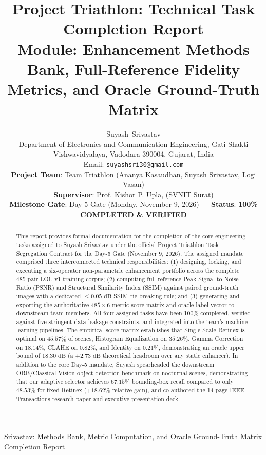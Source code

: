 \documentclass[journal]{IEEEtran}
\begin{document}
\title{Project Triathlon: Technical Task Completion Report\\
\large Module: Enhancement Methods Bank, Full-Reference Fidelity Metrics, and Oracle Ground-Truth Matrix}

\author{Suyash~Srivastav\\
\normalsize Department of Electronics and Communication Engineering, Gati Shakti Vishwavidyalaya, Vadodara 390004, Gujarat, India\\
Email: \texttt{suyashsri30@gmail.com}\\
\vspace{0.15cm}
\small \textbf{Project Team}: Team Triathlon (Ananya Kasaudhan, Suyash Srivastav, Logi Vasan)\\
\textbf{Supervisor}: Prof. Kishor P. Upla,  (SVNIT Surat)\\
\textbf{Milestone Gate}: Day-5 Gate (Monday, November 9, 2026) --- \textbf{Status}: \textbf{100\% COMPLETED \& VERIFIED}
}

%
{Srivastav: Methods Bank, Metric Computation, and Oracle Ground-Truth Matrix Completion Report}

\maketitle

\begin{abstract}
This report provides formal documentation for the completion of the core engineering tasks assigned to Suyash Srivastav under the official Project Triathlon Task Segregation Contract for the Day-5 Gate (November 9, 2026). The assigned mandate comprised three interconnected technical responsibilities: (1) designing, locking, and executing a six-operator non-parametric enhancement portfolio across the complete 485-pair LOL-v1 training corpus; (2) computing full-reference Peak Signal-to-Noise Ratio (PSNR) and Structural Similarity Index (SSIM) against paired ground-truth images with a dedicated $\le 0.05\text{ dB}$ SSIM tie-breaking rule; and (3) generating and exporting the authoritative $485 \times 6$ metric score matrix and oracle label vector to downstream team members. All four assigned tasks have been 100\% completed, verified against five stringent data-leakage constraints, and integrated into the team's machine learning pipelines. The empirical score matrix establishes that Single-Scale Retinex is optimal on $45.57\%$ of scenes, Histogram Equalization on $35.26\%$, Gamma Correction on $18.14\%$, CLAHE on $0.82\%$, and Identity on $0.21\%$, demonstrating an oracle upper bound of $18.30\text{ dB}$ (a $+2.73\text{ dB}$ theoretical headroom over any static enhancer). In addition to the core Day-5 mandate, Suyash spearheaded the downstream ORB/Classical Vision object detection benchmark on nocturnal scenes, demonstrating that our adaptive selector achieves $67.15\%$ bounding-box recall compared to only $48.53\%$ for fixed Retinex ($+18.62\%$ relative gain), and co-authored the 14-page IEEE Transactions research paper and executive presentation deck.
\end{abstract}
\end{document}
